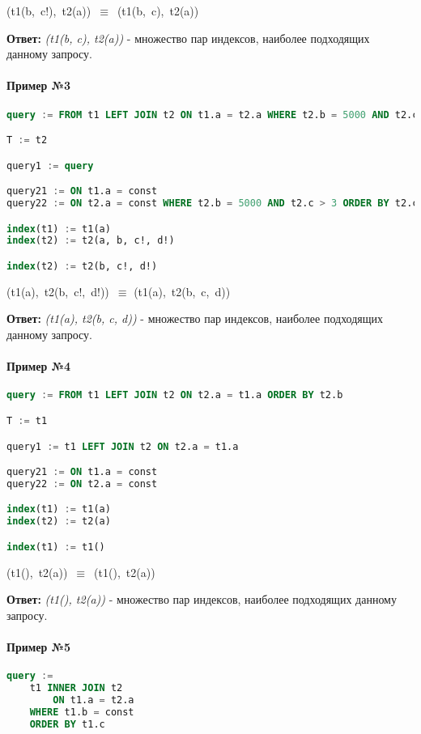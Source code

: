 (t1(b, c!), t2(a)) $\equiv$ {(t1(b, c), t2(a))} 

\textbf{Ответ:} \textit{(t1(b, c), t2(a))} - множество пар индексов, наиболее подходящих данному запросу.


\paragraph{Пример №3}
\begin{lstlisting}[language=SQL]
query := FROM t1 LEFT JOIN t2 ON t1.a = t2.a WHERE t2.b = 5000 AND t2.c > 3 ORDER BY t2.c, t2.d

T := t2

query1 := query 

query21 := ON t1.a = const 
query22 := ON t2.a = const WHERE t2.b = 5000 AND t2.c > 3 ORDER BY t2.c, t2.d 

index(t1) := t1(a) 
index(t2) := t2(a, b, c!, d!) 

index(t2) := t2(b, c!, d!) 
\end{lstlisting}

(t1(a), t2(b, c!, d!)) $\equiv$ (t1(a), t2(b, c, d)) 

\textbf{Ответ:} \textit{(t1(a), t2(b, c, d))} - множество пар индексов, наиболее подходящих данному запросу.


\paragraph{Пример №4}
\begin{lstlisting}[language=SQL]
query := FROM t1 LEFT JOIN t2 ON t2.a = t1.a ORDER BY t2.b

T := t1 

query1 := t1 LEFT JOIN t2 ON t2.a = t1.a 

query21 := ON t1.a = const 
query22 := ON t2.a = const 

index(t1) := t1(a) 
index(t2) := t2(a) 

index(t1) := t1() 
\end{lstlisting}
 
(t1(), t2(a)) $\equiv$ (t1(), t2(a)) 

\textbf{Ответ:} \textit{(t1(), t2(a))} - множество пар индексов, наиболее подходящих данному запросу.


\paragraph{Пример №5}
\begin{lstlisting}[language=SQL]
query := 
    t1 INNER JOIN t2
        ON t1.a = t2.a
    WHERE t1.b = const
    ORDER BY t1.c
\end{lstlisting}


